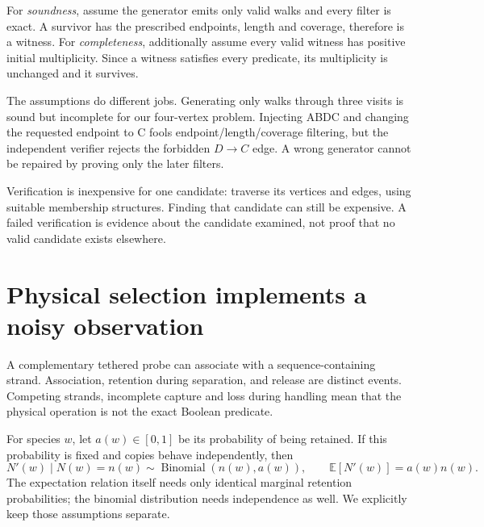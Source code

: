 For \emph{soundness}, assume the generator emits only valid walks and every
filter is exact. A survivor has the prescribed endpoints, length and coverage,
therefore is a witness. For \emph{completeness}, additionally assume every
valid witness has positive initial multiplicity. Since a witness satisfies
every predicate, its multiplicity is unchanged and it survives.

The assumptions do different jobs. Generating only walks through three visits
is sound but incomplete for our four-vertex problem. Injecting ABDC and changing
the requested endpoint to C fools endpoint/length/coverage filtering, but the
independent verifier rejects the forbidden $D\to C$ edge. A wrong generator
cannot be repaired by proving only the later filters.

Verification is inexpensive for one candidate: traverse its vertices and
edges, using suitable membership structures. Finding that candidate can
still be expensive. A failed verification is evidence about the candidate
examined, not proof that no valid candidate exists elsewhere.

\section{Physical selection implements a noisy observation}
A complementary tethered probe can associate with a sequence-containing
strand. Association, retention during separation, and release are distinct
events. Competing strands, incomplete capture and loss during handling mean
that the physical operation is not the exact Boolean predicate.

For species $w$, let $a(w)\in[0,1]$ be its probability of being retained.
If this probability is fixed and copies behave independently, then
\begin{equation}
 N'(w)\mid N(w)=n(w)\sim\operatorname{Binomial}(n(w),a(w)),\qquad
 \mathbb E[N'(w)]=a(w)n(w).
\end{equation}
The expectation relation itself needs only identical marginal retention
probabilities; the binomial distribution needs independence as well.
We explicitly keep those assumptions separate.

